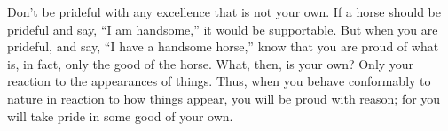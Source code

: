 Don't be prideful with  any excellence that is not your own.  If a horse should
be prideful and say,  ``I am handsome,'' it would be  supportable. But when you
are prideful, and say, ``I have a  handsome horse,'' know that you are proud of
what is,  in fact, only the  good of the horse.  What, then, is your  own? Only
your reaction to  the appearances of things. Thus, when  you behave conformably
to nature in reaction to how things  appear, you will be proud with reason; for
you will take pride in some good of your own.
